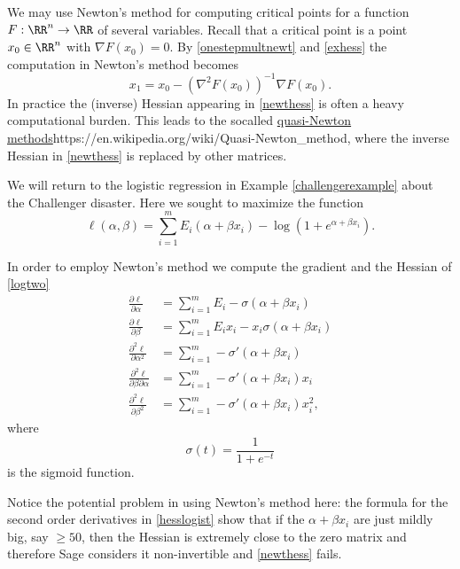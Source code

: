 \documentclass{article}
\begin{document}
We may use Newton's method for computing critical points for a function
$F:\RR^n\rightarrow \RR$ of several variables. Recall that a
critical point is a point $x_0\in \RR^n$ with $\nabla F(x_0) = 0$.
By \eqref{onestepmultnewt} and \eqref{exhess} the computation in Newton's method becomes
\begin{equation}\label{newthess}
x_1 = x_0 - \left(\nabla^2 F(x_0)\right)^{-1} \nabla F(x_0).
\end{equation}
In practice 
the (inverse) Hessian appearing in \eqref{newthess} is often a heavy
computational burden. This leads to the socalled
\url{quasi-Newton methods}{https://en.wikipedia.org/wiki/Quasi-Newton_method}, where
the inverse Hessian in \eqref{newthess} is replaced by other matrices. 


\begin{example}\label{Exbadlogist}
We will return to the logistic regression in Example \ref{challengerexample} about the
Challenger disaster. Here we sought to maximize the function
  \begin{equation}\label{logtwo}
  \ell(\alpha, \beta) = \sum_{i=1}^m E_i (\alpha + \beta x_i) - \log(1 + e^{\alpha + \beta x_i}).
  \end{equation}

In order to employ Newton's method we compute the gradient and the Hessian of \eqref{logtwo}
\begin{align}\label{hesslogist}
  \frac{\partial \ell}{\partial \alpha} &= \sum_{i=1}^m E_i - \sigma(\alpha + \beta x_i)\\
  \frac{\partial \ell}{\partial \beta} &= \sum_{i=1}^m E_i x_i - x_ i\sigma(\alpha + \beta x_i)\\
  \frac{\partial^2 \ell}{\partial \alpha^2} &= \sum_{i=1}^m - \sigma'(\alpha + \beta x_i)\\
  \frac{\partial^2 \ell}{\partial \beta \partial \alpha} &= \sum_{i=1}^m -\sigma'(\alpha + \beta x_i) x_i\\
  \frac{\partial^2 \ell}{\partial \beta^2} &= \sum_{i=1}^m - \sigma'(\alpha + \beta x_i) x_i^2,
\end{align}
where
$$
\sigma(t) = \frac{1}{1 + e^{-t}}
$$
is the sigmoid function.

Notice the potential problem in using Newton's method here: the formula for
the second order derivatives in \eqref{hesslogist} show that if the $\alpha +\beta x_i$ are just mildly big, say $\geq 50$, then
the Hessian is extremely close to the zero matrix and therefore Sage considers it non-invertible and
\eqref{newthess} fails.


\end{example}
\end{document}
